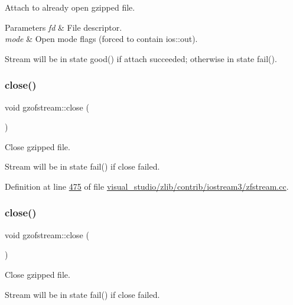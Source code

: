 Attach to already open gzipped file. 


\begin{DoxyParams}{Parameters}
{\em fd} & File descriptor. \\
\hline
{\em mode} & Open mode flags (forced to contain ios\+::out).\\
\hline
\end{DoxyParams}
Stream will be in state good() if attach succeeded; otherwise in state fail(). \mbox{\label{classgzofstream_a59e8b01e1c9741085f18ca456c4b8f54}} 
\subsubsection{\texorpdfstring{close()}{close()}\hspace{0.1cm}{\footnotesize\ttfamily [1/2]}}
{\footnotesize\ttfamily void gzofstream\+::close (\begin{DoxyParamCaption}{ }\end{DoxyParamCaption})}



Close gzipped file. 

Stream will be in state fail() if close failed. 

Definition at line \hyperlink{visual__studio_2zlib_2contrib_2iostream3_2zfstream_8cc_source_l00475}{475} of file \hyperlink{visual__studio_2zlib_2contrib_2iostream3_2zfstream_8cc_source}{visual\+\_\+studio/zlib/contrib/iostream3/zfstream.\+cc}.

\mbox{\label{classgzofstream_a59e8b01e1c9741085f18ca456c4b8f54}} 
\subsubsection{\texorpdfstring{close()}{close()}\hspace{0.1cm}{\footnotesize\ttfamily [2/2]}}
{\footnotesize\ttfamily void gzofstream\+::close (\begin{DoxyParamCaption}{ }\end{DoxyParamCaption})}



Close gzipped file. 

Stream will be in state fail() if close failed. \mbox{\label{classgzofstream_acb1c9c6dccaf41bc5e44c2263ea48de3}} 
